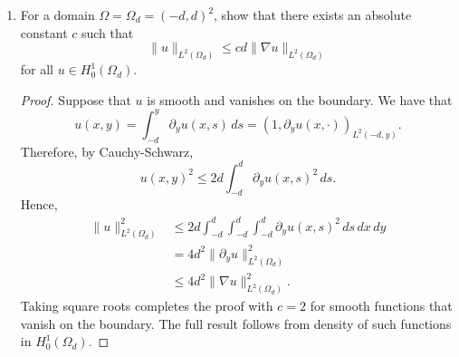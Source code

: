 \documentclass{article}
\begin{document}
\begin{enumerate}
\begin{proof}
		      Since $(v,\psi) \mapsto (f,v)_{L^2(\Omega)}$ and $(v,\psi) \mapsto (g,\psi)_{L^2(\Omega)}$ are continuous on $\mathbb V \times \mathbb W$ so is their sum $(v,\psi) \mapsto (f,v)_{L^2(\Omega)} + (g,\psi)_{L^2(\Omega)}$.
		      Therefore, we conclude by Lax-Milgram that the weak problem indeed has a unique solution.

		      Using coercivity of $a$ and continuity of the right-hand side, we have that
		      \[\|(u,\phi)\|_{\mathbb V \times \mathbb W} \leq \frac{2}{\min\{1,C_P\}}(\|f\|_{L^2(\Omega)} + \|g\|_{L^2(\Omega)})\]
		      for the weak solution $(u,\phi)$.
	      \end{proof}

	\item For a domain $\Omega = \Omega_d = (-d,d)^2$, show that there exists an absolute constant $c$ such that
	      \[\|u\|_{L^2(\Omega_d)} \leq cd\|\nabla u\|_{L^2(\Omega_d)}\]
	      for all $u \in H^1_0(\Omega_d)$.
	      \begin{proof}
		      Suppose that $u$ is smooth and vanishes on the boundary.
		      We have that
		      \[u(x,y) = \int_{-d}^y\partial_y u(x,s)\,ds = (1,\partial_y u (x,\cdot))_{L^2(-d,y)}.\]
		      Therefore, by Cauchy-Schwarz,
		      \[u(x,y)^2 \leq 2d\int_{-d}^d\partial_y u(x,s)^2\,ds.\]
		      Hence,
		      \begin{align*}
			      \|u\|_{L^2(\Omega_d)}^2 & \leq 2d\int_{-d}^d\int_{-d}^d\int_{-d}^d\partial_yu(x,s)^2\,ds\,dx\,dy \\
			                              & = 4d^2\|\partial_y u\|_{L^2(\Omega_d)}^2                               \\
			                              & \leq 4d^2\|\nabla u\|_{L^2(\Omega_d)}^2.
		      \end{align*}
		      Taking square roots completes the proof with $c = 2$ for smooth functions that vanish on the boundary.
		      The full result follows from density of such functions in $H^1_0(\Omega_d)$.
	      \end{proof}


\end{enumerate}
\end{document}
